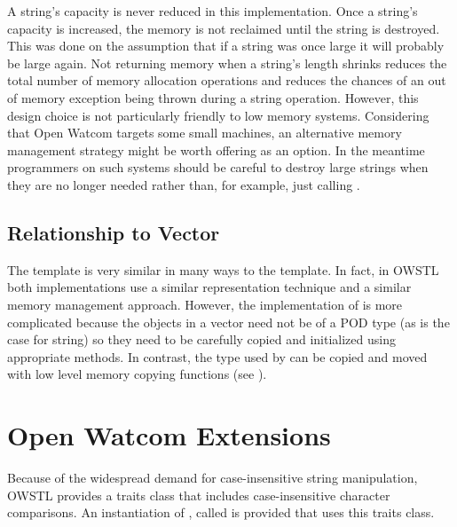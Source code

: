 A string's capacity is never reduced in this implementation. Once a string's
capacity is increased, the memory is not reclaimed until the string is
destroyed. This was done on the assumption that if a string was once large it
will probably be large again. Not returning memory when a string's length
shrinks reduces the total number of memory allocation operations and reduces
the chances of an out of memory exception being thrown during a string
operation. However, this design choice is not particularly friendly to low
memory systems. Considering that Open Watcom targets some small machines, an
alternative memory management strategy might be worth offering as an option.
In the meantime programmers on such systems should be careful to destroy large
strings when they are no longer needed rather than, for example, just calling
.

\subsection{Relationship to Vector}

The  template is very similar in many ways to the
 template. In fact, in OWSTL both implementations use a
similar representation technique and a similar memory management approach.
However, the implementation of  is more complicated because
the objects in a vector need not be of a POD type (as is the case for string)
so they need to be carefully copied and initialized using appropriate methods.
In contrast, the  type used by  can be copied
and moved with low level memory copying functions (see
).

\section{Open Watcom Extensions}

Because of the widespread demand for case-insensitive string manipulation,
OWSTL provides a traits class that includes case-insensitive character
comparisons. An instantiation of , called
 is provided that uses this traits class.
